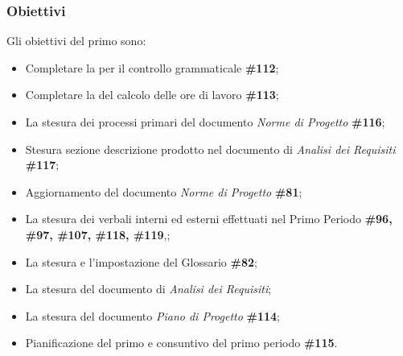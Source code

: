 \subsubsection{Obiettivi}

Gli obiettivi del primo  sono:
\begin{itemize}
    \item Completare la  per il controllo grammaticale \textbf{\#112};
    \item Completare la  del calcolo delle ore di lavoro \textbf{\#113};
    \item La stesura dei processi primari del documento \textit{Norme di Progetto} \textbf{\#116};
    \item Stesura sezione descrizione prodotto nel documento di \textit{Analisi dei Requisiti} \textbf{\#117};
    \item Aggiornamento del documento \textit{Norme di Progetto} \textbf{\#81};
    \item La stesura dei verbali interni ed esterni effettuati nel Primo Periodo \textbf{\#96, \#97, \#107, \#118, \#119},;
    \item La stesura e l'impostazione del Glossario \textbf{\#82};
    \item La stesura del documento di \textit{Analisi dei Requisiti};
    \item La stesura del documento \textit{Piano di Progetto} \textbf{\#114};
    \item Pianificazione del primo  e consuntivo del primo periodo \textbf{\#115}.
\end{itemize}
